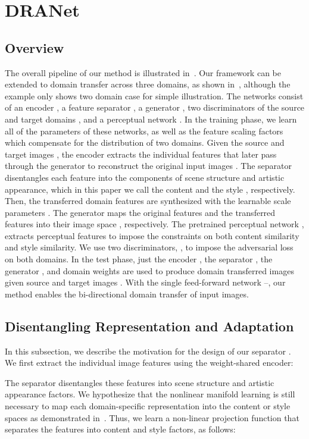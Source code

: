 \documentclass[final]{cvpr}
\begin{document}
\section{DRANet}
\label{sec:method}

\subsection{Overview}
\label{sec:overview}
The overall pipeline of our method is illustrated in~.
Our framework can be extended to domain transfer across three domains, as shown in~, although the example only shows two domain case for simple illustration. 
The networks consist of an encoder , a feature separator , a generator , two discriminators of the source and target domains , and a perceptual network .
In the training phase, we learn all of the parameters of these networks, as well as the feature scaling factors  which compensate for the distribution of two domains.
Given the source and target images , the encoder  extracts the individual features  that later pass through the generator  to reconstruct the original input images .
The separator  disentangles each feature  into the components of scene structure and artistic appearance, which in this paper we call the content  and the style , respectively.
Then, the transferred domain features  are synthesized with the learnable scale parameters .
The generator  maps the original features  and the transferred features  into their image space , respectively.
The pretrained perceptual network , extracts perceptual features to impose the constraints on both content similarity and style similarity.
We use two discriminators, , to impose the adversarial loss on both domains.
In the test phase, just the encoder , the separator , the generator , and domain weights  are used to produce domain transferred images  given source and target images .
With the single feed-forward network --, our method enables the bi-directional domain transfer of input images. 

\subsection{Disentangling Representation and Adaptation}
\label{sec:Network}
In this subsection, we describe the motivation for the design of our separator .
We first extract the individual image features  using the weight-shared encoder:

The separator disentangles these features into scene structure and artistic appearance factors.
We hypothesize that the nonlinear manifold learning is still necessary to map each domain-specific representation into the content or style spaces as demonstrated in~\cite{elgammal2004separating}.
Thus, we learn a non-linear projection function  that separates the features  into content  and style  factors, as follows:
\end{document}
